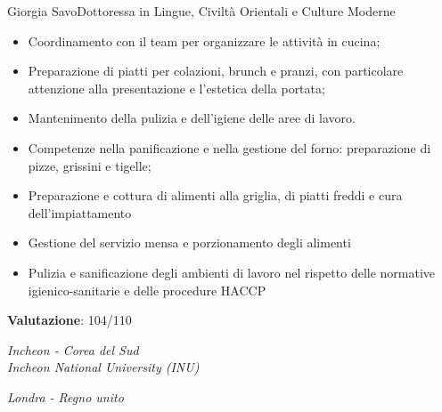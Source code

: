 \documentclass{article}
\begin{document}
\begin{cv}[avatar]{Giorgia Savo}{Dottoressa in Lingue, Civiltà Orientali e Culture Moderne}
\begin{cvevent}[Ottobre 2024][Dicembre 2024]
    \begin{itemize}
	    \item Coordinamento con il team per organizzare le attività in cucina;  
        \item Preparazione di piatti per colazioni, brunch e pranzi, con particolare attenzione alla presentazione e l'estetica della portata;  
        \item Mantenimento della pulizia e dell'igiene delle aree di lavoro.
    \end{itemize}
\end{cvevent}
\begin{cvevent}[Gennaio 2025][Febbraio 2026]
    \begin{itemize}
        \item Competenze nella panificazione e nella gestione del forno: preparazione di pizze, grissini e tigelle;
        \item Preparazione e cottura di alimenti alla griglia, di piatti freddi e cura dell'impiattamento
        \item Gestione del servizio mensa e porzionamento degli alimenti
        \item Pulizia e sanificazione degli ambienti di lavoro nel rispetto delle normative igienico-sanitarie e delle procedure HACCP
    \end{itemize}
\end{cvevent}
\normalsize
{}  %
\small
\begin{cvevent}[2025]
\end{cvevent}
\begin{cvevent}[Settembre 2019][Settembre 2023]
    \small
    \textbf{Valutazione}: 104/110
\end{cvevent}

\begin{cvevent}[Settembre 2014][Luglio 2019]
\end{cvevent}
\normalsize
{}  %
\small
\begin{cvevent}[Marzo 2022][Luglio 2022]
    \textit{Incheon - Corea del Sud}\\
    \textit{Incheon National University (INU)}
\end{cvevent}
\begin{cvevent}[2014]
   \textit{Londra - Regno unito}
\end{cvevent}


\end{cv}
\end{document}
